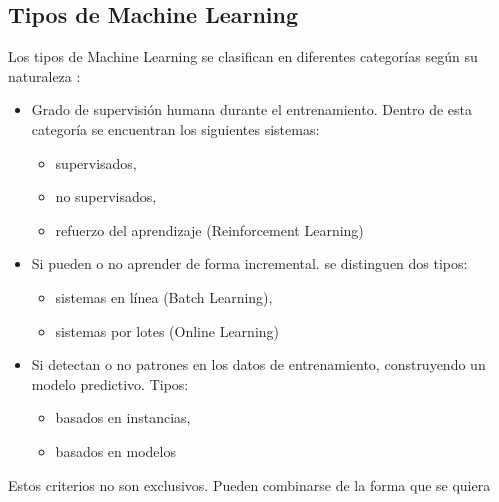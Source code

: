 \documentclass[12pt,a4paper,Spanish]{book}
\begin{document}
\subsection{Tipos de Machine Learning}
Los tipos de Machine Learning se clasifican en diferentes categorías según su naturaleza \cite{geron2022hands}:
\begin{itemize}
	\item Grado de supervisión humana durante el entrenamiento. Dentro de esta categoría se encuentran los siguientes sistemas:
	\begin{itemize}
		\item supervisados,
		\item no supervisados,
		\item refuerzo del aprendizaje (Reinforcement Learning)
	\end{itemize}
	\item Si pueden o no aprender de forma incremental. se distinguen dos tipos:
	\begin{itemize}
		\item sistemas en línea (Batch Learning),
		\item sistemas por lotes (Online Learning)
	\end{itemize}
	\item Si detectan o no patrones en los datos de entrenamiento, construyendo un modelo predictivo. Tipos:
	\begin{itemize}
		\item basados en instancias,
		\item basados en modelos
	\end{itemize}
\end{itemize}
Estos criterios no son exclusivos. Pueden combinarse de la forma que se quiera
\end{document}
